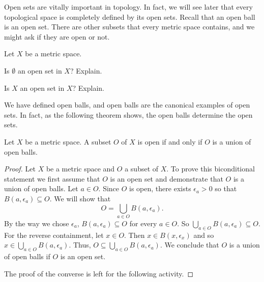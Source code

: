 \label{sec_open_sets}

Open sets are vitally important in topology. In fact, we will see later that every topological space is completely defined by its open sets. Recall that an open ball is an open set. There are other subsets that every metric space contains, and we might ask if they are open or not.  

\begin{activity} Let $X$ be a metric space.
\ba
\item Is $\emptyset$ an open set in $X$? Explain.

\item Is $X$ an open set in $X$? Explain.

\ea

\end{activity}

\begin{comment}

\ActivitySolution

\ba
\item Since $\emptyset$ contains no points, it follows that $\emptyset$ is a neighborhood of each of its points. So $\emptyset$ is an open set. 

\item Let $a \in X$. For any $\epsilon > 0$, the ball $B(a,\epsilon)$ is a subset of $X$. Thus, $X$ is a neighborhood of each of its points and $X$ is an open set in $X$. 

\ea

\end{comment}


We have defined open balls, and open balls are the canonical examples of open sets. In fact, as the following theorem shows, the open balls determine the open sets.

\begin{theorem} \label{thm:OS_1} Let $X$ be a metric space. A subset $O$ of $X$ is open if and only if $O$ is a union of open balls.
\end{theorem}

\begin{proof} Let $X$ be a metric space and $O$ a subset of $X$. To prove this biconditional statement we first assume that $O$ is an open set and demonstrate that $O$ is a union of open balls. Let $a \in O$. Since $O$ is open, there exists $\epsilon_a > 0$ so that $B(a, \epsilon_a) \subseteq O$. We will show that 
\[O = \bigcup_{a \in O} B(a, \epsilon_a).\]
By the way we chose $\epsilon_a$, $B(a, \epsilon_a) \subseteq O$ for every $a \in O$. So $\bigcup_{a \in O} B(a, \epsilon_a) \subseteq O$. For the reverse containment, let $x \in O$. Then $x \in B(x, \epsilon_x)$ and so $x \in \bigcup_{a \in O} B(a, \epsilon_a)$. Thus, $O \subseteq \bigcup_{a \in O} B(a, \epsilon_a)$. We conclude that $O$ is a union of open balls if $O$ is an open set.

The proof of the converse is left for the following activity.
\end{proof}


